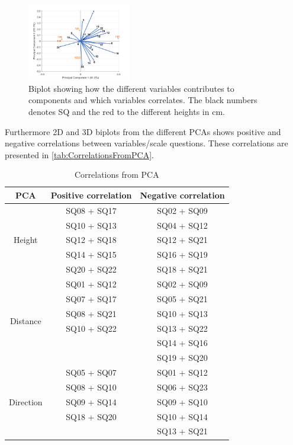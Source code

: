 %
\begin{figure}
	\centering
	\includegraphics[width = 0.40\textwidth]{Figure/RHeight-Biplot.png}
	\setlength{} 
	\caption{Biplot showing how the different variables contributes to components and which variables correlates. The black numbers denotes SQ and the red to the different heights in cm.}
	\label{fig:biplot}
\end{figure}
\noindent
%
Furthermore 2D and 3D biplots from the different PCAs shows positive and negative correlations between variables/scale questions. These correlations are presented in \autoref{tab:CorrelationsFromPCA}.
%
\begin{table}
	\centering
	\caption{Correlations from PCA}
	\label{tab:CorrelationsFromPCA} 
	\begin{tabular}{ c|c|c }
		\centering
		PCA & Positive correlation & Negative correlation \\ \hline
		\multirow{5}{*}{Height} & SQ08  + SQ17 & SQ02  + SQ09 \\
		& SQ10 + SQ13 & SQ04 + SQ12 \\
		& SQ12 + SQ18 & SQ12 + SQ21 \\
		& SQ14 + SQ15 & SQ16 + SQ19 \\
		& SQ20 + SQ22 & SQ18 + SQ21\\ \hline
		\multirow{6}{*}{Distance} & SQ01 + SQ12 & SQ02 + SQ09 \\
		& SQ07 + SQ17 & SQ05 + SQ21 \\
		& SQ08 + SQ21 & SQ10 + SQ13 \\
		& SQ10 + SQ22 & SQ13 + SQ22 \\
		&  & SQ14 + SQ16 \\	
		&  & SQ19 + SQ20 \\ \hline	
		\multirow{5}{*}{Direction} 
		& SQ05 + SQ07 & SQ01 + SQ12 \\
		& SQ08 + SQ10 & SQ06 + SQ23 \\
		& SQ09 + SQ14 & SQ09 + SQ10 \\
		& SQ18 + SQ20 & SQ10 + SQ14 \\
		&  & SQ13 + SQ21
	
	\end{tabular}        
\end{table}
\noindent
%

